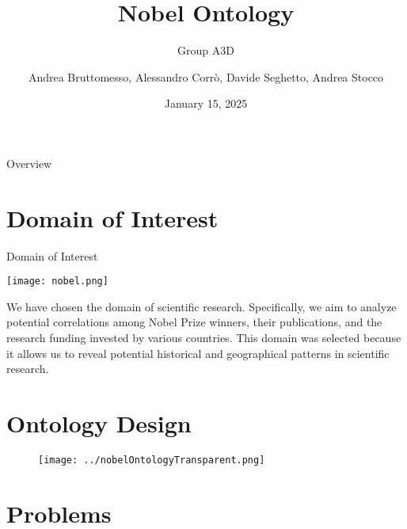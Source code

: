 \documentclass[aspectratio=169,xcolor=dvipsnames]{beamer}
\title{Nobel Ontology}
\subtitle{Group A3D}
\author{Andrea Bruttomesso, Alessandro Corr\`o, Davide Seghetto, Andrea Stocco}
\date{January 15, 2025} %
\begin{document}
\begin{frame}
	\titlepage
\end{frame}

\begin{frame}{Overview}
	\tableofcontents
\end{frame}

\section{Domain of Interest}

\begin{frame}{Domain of Interest}
	\centering
	\begin{minipage}{0.3\textwidth}
		\centering
		\texttt{[image: nobel.png]} %
	\end{minipage}%
	\hspace{3em}
	\begin{minipage}{0.4\textwidth}
		\centering
		We have chosen the domain of scientific research. Specifically, we aim to analyze potential correlations among Nobel Prize winners,
		their publications, and the research funding invested by various countries. This domain was selected because it allows us to reveal potential historical
		and geographical patterns in scientific research.
	\end{minipage}%
\end{frame}

\section{Ontology Design}

\begin{frame}
	\begin{figure}
		\texttt{[image: ../nobelOntologyTransparent.png]}
	\end{figure}
\end{frame}

\section{Problems}
\end{document}
